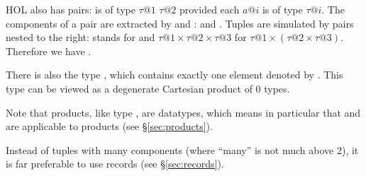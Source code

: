 %
\begin{isabellebody}%
\def\isabellecontext{pairs}%
%
\begin{isamarkuptext}%
\label{sec:pairs}
HOL also has pairs:  is of type $\tau@1$
 $\tau@2$ provided each $a@i$ is of type
$\tau@i$. The components of a pair are extracted by  and
:
  and . Tuples
are simulated by pairs nested to the right:  stands
for  and $\tau@1 \times \tau@2 \times \tau@3$ for
$\tau@1 \times (\tau@2 \times \tau@3)$. Therefore we have
.

There is also the type , which contains exactly one
element denoted by . This type can be viewed
as a degenerate Cartesian product of 0 types.

Note that products, like type , are datatypes, which means
in particular that  and  are applicable to
products (see \S\ref{sec:products}).

Instead of tuples with many components (where ``many'' is not much above 2),
it is far preferable to use records (see \S\ref{sec:records}).%
\end{isamarkuptext}%
\end{isabellebody}%
